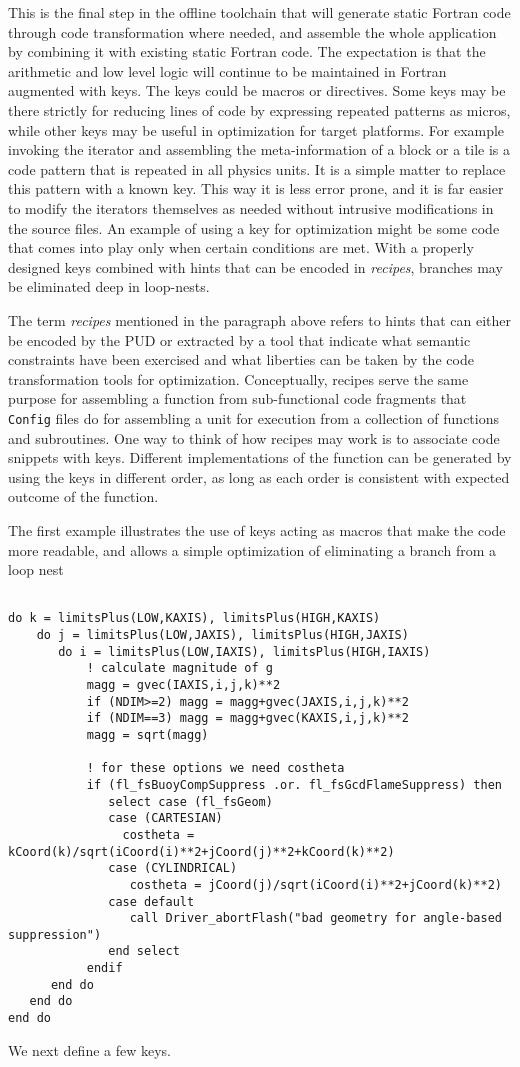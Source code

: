 \documentclass{article}
\newcommand{\code}[1]{{\tt#1}}
\newcommand{\shortPUD}   {PUD\xspace}
\newcommand{\PUD}    {\shortPUD}
\begin{document}
This is the final step in the offline toolchain that will generate
static Fortran code through code transformation where needed, and
assemble the whole application by combining it with existing static
Fortran code. The expectation is that the arithmetic and low level
logic will continue to be maintained in Fortran augmented with
keys. The keys could be macros or directives. Some keys may be there
strictly for reducing lines of code by expressing repeated patterns as
micros, while other keys may be useful in optimization for target
platforms. For example invoking the iterator and assembling the
meta-information of a block or a tile is a code pattern that is
repeated in all physics units. It is a simple matter to replace this
pattern with a known key. This way it is less error prone, and it is
far easier to modify the iterators themselves as needed without
intrusive modifications in the source files. An example of using a key
for optimization might be some code that comes into play only when
certain conditions are met. With a properly designed keys combined with
hints that can be encoded in {\it recipes}, branches may be eliminated
deep in loop-nests.

The term {\it recipes} mentioned in the paragraph above refers to
hints that can either be encoded by the \PUD or extracted by a tool
that indicate what semantic constraints have been exercised and what
liberties can be taken by the code transformation tools for
optimization. Conceptually, recipes serve the same purpose for
assembling a function from sub-functional code fragments that
\code{Config} files do for assembling a unit for execution from a
collection of functions and subroutines. One way to think of how
recipes may work is to associate code snippets with keys. Different
implementations of the function can be generated by using the keys in
different order, as long as each order is consistent with expected outcome of the
function.

The first example illustrates the use of keys acting as macros that
make the code more readable, and allows a simple optimization of
eliminating a branch from a loop nest
\begin{verbatim}

do k = limitsPlus(LOW,KAXIS), limitsPlus(HIGH,KAXIS)
    do j = limitsPlus(LOW,JAXIS), limitsPlus(HIGH,JAXIS)
       do i = limitsPlus(LOW,IAXIS), limitsPlus(HIGH,IAXIS)
           ! calculate magnitude of g
           magg = gvec(IAXIS,i,j,k)**2
           if (NDIM>=2) magg = magg+gvec(JAXIS,i,j,k)**2
           if (NDIM==3) magg = magg+gvec(KAXIS,i,j,k)**2
           magg = sqrt(magg)

           ! for these options we need costheta
           if (fl_fsBuoyCompSuppress .or. fl_fsGcdFlameSuppress) then
              select case (fl_fsGeom)
              case (CARTESIAN)
                costheta = kCoord(k)/sqrt(iCoord(i)**2+jCoord(j)**2+kCoord(k)**2)
              case (CYLINDRICAL)
                 costheta = jCoord(j)/sqrt(iCoord(i)**2+jCoord(k)**2)
              case default
                 call Driver_abortFlash("bad geometry for angle-based suppression")
              end select
           endif
      end do
   end do
end do
\end{verbatim}
We next define a few keys.
\end{document}
